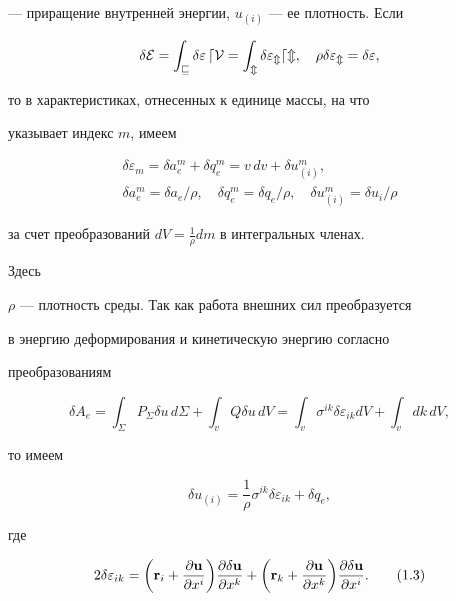 --- приращение внутренней энергии, $u_{(i)}$ --- ее плотность. Если


$$


\delta\cal E=\int_v\delta\varepsilon\,dV=\int_m\delta\varepsilon_m dm,


\quad \rho \delta\varepsilon_m=\delta\varepsilon,


$$


то в характеристиках, отнесенных к единице массы, на что


указывает индекс $m$, имеем


\begin{gather*}


\delta\varepsilon_m=\delta a^m_e+\delta q^m_e=v\,dv+


\delta u^m_{(i)},\\


\delta a^m_e=\delta a_e/\rho ,\quad


\delta q^m_e=\delta q_e/\rho ,\quad


\delta u^m_{(i)}=\delta u_i/\rho


\end{gather*}


за счет преобразований $dV=\frac{1}{\rho }dm$ в интегральных членах.


Здесь


$\rho $ --- плотность среды. Так как работа внешних сил преобразуется


в энергию деформирования и кинетическую энергию согласно


преобразованиям


\begin{equation}


\delta A_e=\int_{\Sigma}P_\Sigma\delta u\,d\Sigma+


\int_v Q\delta u\,dV=\int_v \sigma^{ik}\delta\varepsilon_{ik}dV+


\int_vdk\,dV,\tag{1.1}


\end{equation}


то имеем


\begin{equation}


\delta u_{(i)}=\frac{1}{\rho }\sigma^{ik}\delta\varepsilon_{ik}


+\delta q_e,\tag{1.2}


\end{equation}


где


\begin{equation}


2\delta\varepsilon_{ik}=\biggl({\bold r}_i+


\frac{\partial{\bold u}}{\partial x^i}\biggr)


\frac{\partial\delta{\bold u}}{\partial x^k}+\biggl({\bold r}_k+


\frac{\partial {\bold u}}{\partial x^k}\biggr)


\frac{\partial\delta{\bold u}}{\partial x^i}.\tag{1.3}


\end{equation}


